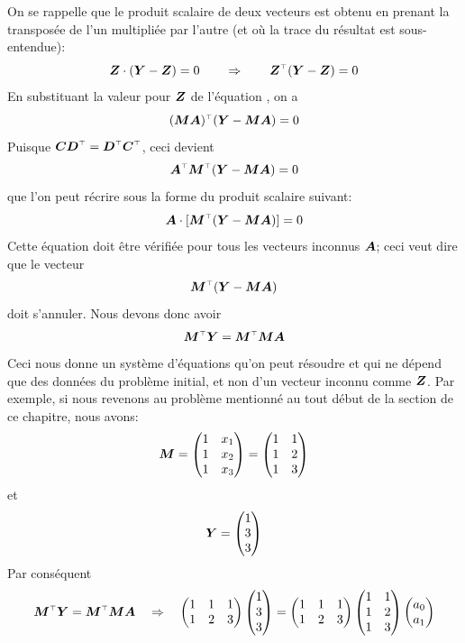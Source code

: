 On se rappelle que le produit scalaire de deux vecteurs est obtenu
en prenant la transposée de l'un multipliée par l'autre (et où la
trace du résultat est sous-entendue):
\[
\matZ \cdot (\matY -\matZ) = 0 \qquad\Rightarrow\qquad \transp{\matZ} (\matY -\matZ) = 0
\]
En substituant la valeur pour $\boldsymbol{Z}$ de l'équation , on a
\[
\transp{(\matM\matA)} (\matY - \matM\matA) = 0
\]
Puisque $\transp{\matC\matD} = \transp{\matD}\transp{\matC}$, ceci devient
\[
\transp{\matA}\transp{\matM} (\matY - \matM\matA) = 0
\]
que l'on peut récrire sous la forme du produit scalaire suivant:
\[
\matA\cdot[\transp{\matM} (\matY - \matM\matA)] = 0
\]
Cette équation doit être vérifiée pour tous les vecteurs inconnus $\boldsymbol{A}$; ceci veut dire que le vecteur
\[
\transp{\matM} (\matY - \matM\matA)
\]
doit s'annuler.  Nous devons donc avoir 
\begin{equation}
\transp{\matM} \matY =  \transp{\matM}\matM\matA \label{eq:regression}
\end{equation}
Ceci nous donne un système d'équations qu'on peut résoudre et qui ne dépend que des données du problème initial,
et non d'un vecteur inconnu comme $\boldsymbol{Z}$.
Par exemple, si nous revenons au problème mentionné au tout début de la section de ce chapitre, nous avons:
\[
\boldsymbol{M} = \begin{pmatrix}
1 & x_1 \\
1 & x_2 \\
1 & x_3
\end{pmatrix} = \begin{pmatrix}
1 & 1 \\
1 & 2 \\
1 & 3
\end{pmatrix}
\]
et
\[
\boldsymbol{Y} = \begin{pmatrix}
1 \\ 3 \\ 3
\end{pmatrix}
\]
Par conséquent 
\[
\transp{\matM} \matY =  \transp{\matM}\matM\matA \quad\Rightarrow\quad
\begin{pmatrix}
1 & 1 & 1\\
1 & 2 & 3
\end{pmatrix}                       
\begin{pmatrix}
1 \\ 3 \\ 3
\end{pmatrix}
= \begin{pmatrix}
1 & 1 & 1 \\
1 & 2 & 3
\end{pmatrix}
\begin{pmatrix}
1 & 1 \\
1 & 2 \\
1 & 3
\end{pmatrix}
\begin{pmatrix}
a_0 \\ a_1
\end{pmatrix}
\]
